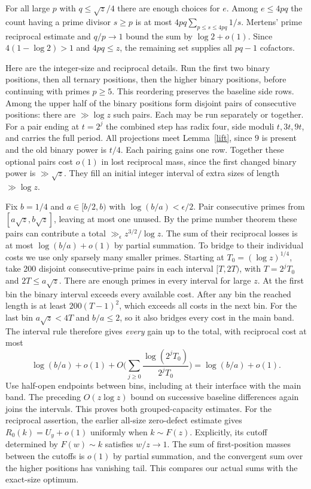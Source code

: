 \documentclass[11pt]{article}
\begin{document}
For all large $p$ with $q\le\sqrt z/4$ there are enough choices for $e$. Among $e\le 4pq$ the count having a prime divisor $s\ge p$ is at most $4pq\sum_{p\le s\le4pq}1/s$. Mertens' prime reciprocal estimate and $q/p\to1$ bound the sum by $\log 2+o(1)$. Since $4(1-\log 2)>1$ and $4pq\le z$, the remaining set supplies all $pq-1$ cofactors.

Here are the integer-size and reciprocal details. Run the first two binary positions, then all ternary positions, then the higher binary positions, before continuing with primes $p\ge5$. This reordering preserves the baseline side rows. Among the upper half of the binary positions form disjoint pairs of consecutive positions: there are $\gg\log z$ such pairs. Each may be run separately or together. For a pair ending at $t=2^j$ the combined step has radix four, side moduli $t,3t,9t$, and carries the full period. All projections meet Lemma~\ref{lift}, since $9$ is present and the old binary power is $t/4$. Each pairing gains one row. Together these optional pairs cost $o(1)$ in lost reciprocal mass, since the first changed binary power is $\gg\sqrt z$. They fill an initial integer interval of extra sizes of length $\gg\log z$.

Fix $b=1/4$ and $a\in[b/2,b)$ with $\log(b/a)<\epsilon/2$. Pair consecutive primes from $[a\sqrt z,b\sqrt z]$, leaving at most one unused. By the prime number theorem these pairs can contribute a total $\gg_\epsilon z^{3/2}/\log z$. The sum of their reciprocal losses is at most $\log(b/a)+o(1)$ by partial summation. To bridge to their individual costs we use only sparsely many smaller primes. Starting at $T_0=(\log z)^{1/4}$, take 200 disjoint consecutive-prime pairs in each interval $[T,2T)$, with $T=2^jT_0$ and $2T\le a\sqrt z$. There are enough primes in every interval for large $z$. At the first bin the binary interval exceeds every available cost. After any bin the reached length is at least $200(T-1)^2$, which exceeds all costs in the next bin. For the last bin $a\sqrt z<4T$ and $b/a\le2$, so it also bridges every cost in the main band. The interval rule therefore gives \emph{every} gain up to the total, with reciprocal cost at most
\[
 \log(b/a)+o(1)+O\Big(\sum_{j\ge0}\frac{\log(2^jT_0)}{2^jT_0}\Big)
 =\log(b/a)+o(1).
\]
Use half-open endpoints between bins, including at their interface with the main band. The preceding $O(z\log z)$ bound on successive baseline differences again joins the intervals. This proves both grouped-capacity estimates. For the reciprocal assertion, the earlier all-size zero-defect estimate gives $R_0(k)=U_y+o(1)$ uniformly when $k\sim F(z)$. Explicitly, its cutoff determined by $F(w)\sim k$ satisfies $w/z\to1$. The sum of first-position masses between the cutoffs is $o(1)$ by partial summation, and the convergent sum over the higher positions has vanishing tail. This compares our actual sums with the exact-size optimum.
\end{document}
